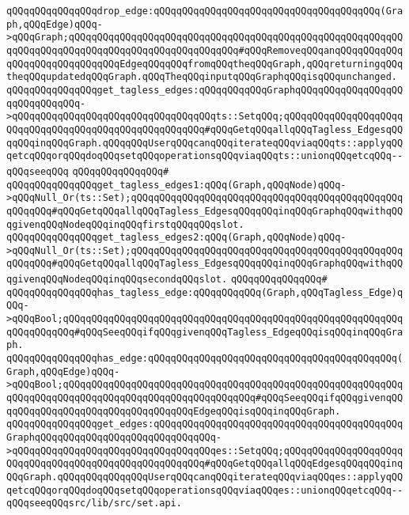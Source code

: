 \verb|qQQqqQQqqQQqqQQqdrop_edge:qQQqqQQqqQQqqQQqqQQqqQQqqQQqqQQqqQQqqQQq(Graph,qQQqEdge)qQQq->qQQqGraph;qQQqqQQqqQQqqQQqqQQqqQQqqQQqqQQqqQQqqQQqqQQqqQQqqQQqqQQqqQQqqQQqqQQqqQQqqQQqqQQqqQQqqQQqqQQqqQQqqQQq#qQQqRemoveqQQqanqQQqqQQqqQQqqQQqqQQqqQQqqQQqqQQqEdgeqQQqqQQqfromqQQqtheqQQqGraph,qQQqreturningqQQqtheqQQqupdatedqQQqGraph.qQQqTheqQQqinputqQQqGraphqQQqisqQQqunchanged.|\newline
\newline
\newline
\verb|qQQqqQQqqQQqqQQqget_tagless_edges:qQQqqQQqqQQqGraphqQQqqQQqqQQqqQQqqQQqqQQqqQQqqQQq->qQQqqQQqqQQqqQQqqQQqqQQqqQQqqQQqqQQqts::SetqQQq;qQQqqQQqqQQqqQQqqQQqqQQqqQQqqQQqqQQqqQQqqQQqqQQqqQQqqQQq#qQQqGetqQQqallqQQqTagless_EdgesqQQqqQQqinqQQqGraph.qQQqqQQqUserqQQqcanqQQqiterateqQQqviaqQQqts::applyqQQqetcqQQqorqQQqdoqQQqsetqQQqoperationsqQQqviaqQQqts::unionqQQqetcqQQq--qQQqseeqQQq|\newline
\verb|qQQqqQQqqQQqqQQq#|\newline
\verb|qQQqqQQqqQQqqQQqget_tagless_edges1:qQQq(Graph,qQQqNode)qQQq->qQQqNull_Or(ts::Set);qQQqqQQqqQQqqQQqqQQqqQQqqQQqqQQqqQQqqQQqqQQqqQQqqQQqqQQq#qQQqGetqQQqallqQQqTagless_EdgesqQQqqQQqinqQQqGraphqQQqwithqQQqgivenqQQqNodeqQQqinqQQqfirstqQQqqQQqslot.|\newline
\verb|qQQqqQQqqQQqqQQqget_tagless_edges2:qQQq(Graph,qQQqNode)qQQq->qQQqNull_Or(ts::Set);qQQqqQQqqQQqqQQqqQQqqQQqqQQqqQQqqQQqqQQqqQQqqQQqqQQqqQQq#qQQqGetqQQqallqQQqTagless_EdgesqQQqqQQqinqQQqGraphqQQqwithqQQqgivenqQQqNodeqQQqinqQQqsecondqQQqslot.|\newline
\verb|qQQqqQQqqQQqqQQq#|\newline
\verb|qQQqqQQqqQQqqQQqhas_tagless_edge:qQQqqQQqqQQq(Graph,qQQqTagless_Edge)qQQq->qQQqBool;qQQqqQQqqQQqqQQqqQQqqQQqqQQqqQQqqQQqqQQqqQQqqQQqqQQqqQQqqQQqqQQqqQQqqQQq#qQQqSeeqQQqifqQQqgivenqQQqTagless_EdgeqQQqisqQQqinqQQqGraph.|\newline
\verb|qQQqqQQqqQQqqQQqhas_edge:qQQqqQQqqQQqqQQqqQQqqQQqqQQqqQQqqQQqqQQqqQQq(Graph,qQQqEdge)qQQq->qQQqBool;qQQqqQQqqQQqqQQqqQQqqQQqqQQqqQQqqQQqqQQqqQQqqQQqqQQqqQQqqQQqqQQqqQQqqQQqqQQqqQQqqQQqqQQqqQQqqQQqqQQqqQQq#qQQqSeeqQQqifqQQqgivenqQQqqQQqqQQqqQQqqQQqqQQqqQQqqQQqqQQqEdgeqQQqisqQQqinqQQqGraph.|\newline
\newline
\verb|qQQqqQQqqQQqqQQqget_edges:qQQqqQQqqQQqqQQqqQQqqQQqqQQqqQQqqQQqqQQqqQQqGraphqQQqqQQqqQQqqQQqqQQqqQQqqQQqqQQq->qQQqqQQqqQQqqQQqqQQqqQQqqQQqqQQqqQQqes::SetqQQq;qQQqqQQqqQQqqQQqqQQqqQQqqQQqqQQqqQQqqQQqqQQqqQQqqQQqqQQq#qQQqGetqQQqallqQQqEdgesqQQqqQQqinqQQqGraph.qQQqqQQqqQQqqQQqUserqQQqcanqQQqiterateqQQqviaqQQqes::applyqQQqetcqQQqorqQQqdoqQQqsetqQQqoperationsqQQqviaqQQqes::unionqQQqetcqQQq--qQQqseeqQQqsrc/lib/src/set.api.|\newline
